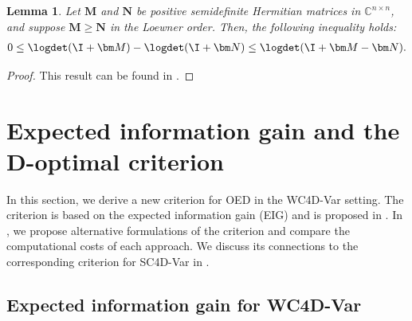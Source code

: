 \documentclass{aims} %
\newtheorem{lemma}[theorem]{Lemma}
\theoremstyle{definition}
\begin{document}
\begin{lemma}\label{lemma:logdet_MN}
Let \( \bm M \) and \( \bm N \) be positive semidefinite Hermitian matrices in \( \mathbb{C}^{n \times n} \), and suppose \( \bm M \geq \bm N \) in the Loewner order. Then, the following inequality holds:
\begin{align}
   0\leq  \logdet(\I + \bm M) - \logdet(\I + \bm N) \leq \logdet(\I + \bm M - \bm N).
\end{align}
\end{lemma}

\begin{proof}
 This result can be found in \cite[Lemma 9]{D-Optimal_2018}.
 \end{proof}




\section{Expected information gain and the D-optimal criterion}\label{sec:eig}
In this section, we derive a new criterion for OED in the WC4D-Var setting. 
The criterion is based on the expected information gain (EIG) and is proposed in . 
In , we propose  alternative formulations of the criterion and compare the computational costs of each approach. We discuss its connections to the corresponding criterion for SC4D-Var in . 



\subsection{Expected information gain for WC4D-Var}\label{ssec:eig4dvar}
\end{document}
